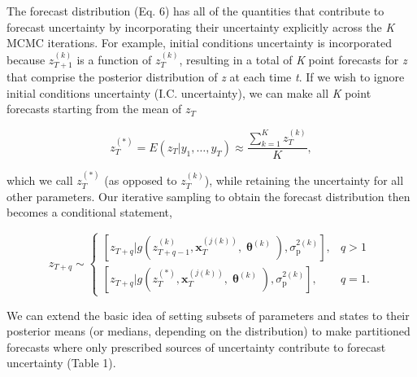 \documentclass[12pt,]{article}
\begin{document}
The forecast distribution (Eq. 6) has all of the quantities that
contribute to forecast uncertainty by incorporating their uncertainty
explicitly across the \emph{K} MCMC iterations. For example, initial
conditions uncertainty is incorporated because \(z_{T+1}^{(k)}\) is a
function of \(z_{T}^{(k)}\), resulting in a total of \emph{K} point
forecasts for \emph{z} that comprise the posterior distribution of
\emph{z} at each time \emph{t}. If we wish to ignore initial conditions
uncertainty (I.C. uncertainty), we can make all \emph{K} point forecasts
starting from the mean of \(z_{T}\)

\begin{equation}
z_{T}^{(*)} = E(z_{T} | y_1,\dots,y_T) \approx \frac{\sum^K_{k=1} z_{T}^{(k)}}{K},
\end{equation}

\noindent{}which we call \(z^{(*)}_T\) (as opposed to \(z^{(k)}_T\)),
while retaining the uncertainty for all other parameters. Our iterative
sampling to obtain the forecast distribution then becomes a conditional
statement,

\begin{equation}
    z_{T+q} \sim 
\begin{cases}
    \left[z_{T+q} | g(z_{T+q-1}^{(k)}, \textbf{x}_T^{(j(k))}, \bm{\uptheta}^{(k)}), \sigma^{2(k)}_{\text{p}} \right], &q>1 \\
    \left[z_{T+q} | g(z_{T}^{(*)}, \textbf{x}_T^{(j(k))}, \bm{\uptheta}^{(k)}), \sigma^{2(k)}_{\text{p}} \right], &q=1.
\end{cases}
\end{equation}

\noindent{}We can extend the basic idea of setting subsets of parameters
and states to their posterior means (or medians, depending on the
distribution) to make partitioned forecasts where only prescribed
sources of uncertainty contribute to forecast uncertainty (Table 1).
\end{document}
